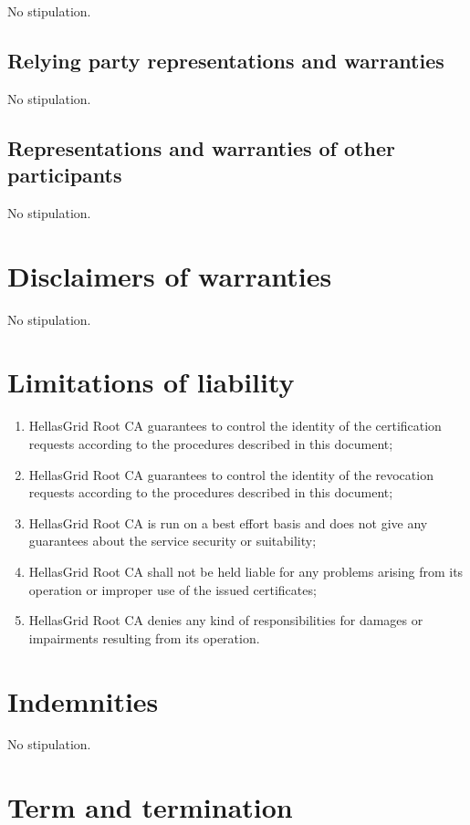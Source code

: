 \documentclass[11pt,a4paper,titlepage]{book}
\begin{document}
No stipulation.

\subsection{Relying party representations and warranties}

No stipulation.

\subsection{Representations and warranties of other participants}

No stipulation.

\section{Disclaimers of warranties}

No stipulation.

\section{Limitations of liability}

\begin{enumerate}
\item{HellasGrid Root CA guarantees to control the identity of the certification requests according to the procedures described in this document;}
\item{HellasGrid Root CA guarantees to control the identity of the revocation requests according to the procedures described in this document;}
\item{HellasGrid Root CA is run on a best effort basis and does not give any guarantees about the service security or suitability;}
\item{HellasGrid Root CA shall not be held liable for any problems arising from its operation or improper use of the issued certificates;}
\item{HellasGrid Root CA denies any kind of responsibilities for damages or impairments resulting from its operation.}
\end{enumerate}

\section{Indemnities}

No stipulation. 

\section{Term and termination}
\end{document}

